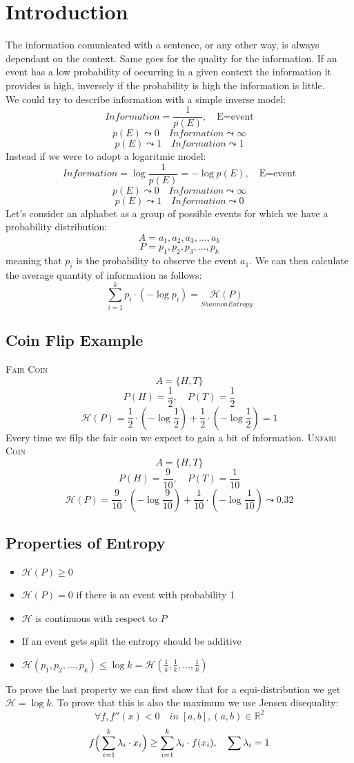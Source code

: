 \section{Introduction}
The information comunicated with a sentence, or any other way, is always dependant on the context. Same goes for the quality for the information. If an event has a low probability of occurring in a given context the information it provides is high, inversely if the probability is high the information is little.\\
We could try to describe information with a simple inverse model:
$$ Information = \frac{1}{p(E)}, \quad \text{E=event}$$
$$p(E)\leadsto 0 \quad Information \leadsto \infty$$
$$p(E)\leadsto 1 \quad Information \leadsto 1$$
Instead if we were to adopt a logaritmic model:
$$Information = \log{\frac{1}{p(E)}}=-\log{p(E)}, \quad \text{E=event}$$
$$p(E)\leadsto 0 \quad Information \leadsto \infty$$
$$p(E)\leadsto 1 \quad Information \leadsto 0$$
Let's consider an alphabet as a group of possible events for which we have a probability distribution:
$$A={a_1,a_2,a_3,\ldots,a_k}$$
$$P={p_1,p_2,p_3,\ldots,p_k}$$
meaning that $p_i$ is the probability to observe the event $a_1$. We can then calculate the average quantity of information as follows:
\begin{equation}
    \sum_{i=1}^{k}{p_i\cdot (-\log{p_i})} = \underset{Shannon Entropy}{\mathcal{H}(P)}
\end{equation}
\subsection{Coin Flip Example}
\textsc{Fair Coin}
$$A=\{H,T\}$$
$$P(H)=\frac{1}{2},\quad P(T)=\frac{1}{2}$$
$$\mathcal{H}(P)=\frac{1}{2}\cdot(-\log{\frac{1}{2}})+\frac{1}{2}\cdot(-\log{\frac{1}{2}})=1$$
Every time we filp the fair coin we expect to gain a bit of information.
\textsc{Unfari Coin}
$$A=\{H,T\}$$
$$P(H)=\frac{9}{10},\quad P(T)=\frac{1}{10}$$
$$\mathcal{H}(P)=\frac{9}{10}\cdot(-\log{\frac{9}{10}})+\frac{1}{10}\cdot(-\log{\frac{1}{10}})\leadsto 0.32$$
\subsection{Properties of Entropy}
\begin{itemize}
    \item $\mathcal{H}(P)\geq 0$
    \item $\mathcal{H}(P) = 0$ if there is an event with probability 1
    \item $\mathcal{H}$ is continuous with respect to $P$
    \item If an event gets split the entropy should be additive
    \item $\mathcal{H}(p_1,p_2,\ldots,p_k)\leq \log{k}= \mathcal{H}(\frac{1}{k},\frac{1}{k},\ldots,\frac{1}{k})$
\end{itemize}
To prove the last property we can first show that for a equi-distribution we get $\mathcal{H}=\log{k}$. To prove that this is also the maximum we use Jensen disequality:
$$\forall f, f''(x)<0 \quad in\;[a,b], (a,b)\in \mathbb{R}^2$$
$$f\Big{(}\sum_{i=1}^{k}{\lambda_i\cdot x_i}\Big{)}\geq\sum_{i=1}^{k}{\lambda_i\cdot f(x_i)}, \quad \sum{\lambda_i} = 1$$

